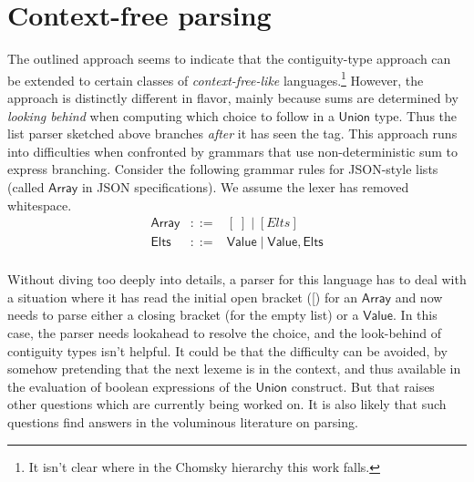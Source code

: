 \documentclass{article}
\newcommand{\konst}[1]{\ensuremath{\mathsf{#1}}}
\theoremstyle{definition}
\begin{document}

\section{Context-free parsing}

The outlined approach seems to indicate that the contiguity-type
approach can be extended to certain classes of
\emph{context-free-like} languages.\footnote{It isn't clear where in
  the Chomsky hierarchy this work falls.} However, the approach
is distinctly different in flavor, mainly because sums are determined
by \emph{looking behind} when computing which choice to follow in a
\konst{Union} type. Thus the list parser sketched above branches
\emph{after} it has seen the tag. This approach runs into difficulties when
confronted by grammars that use non-deterministic sum to express
branching. Consider the following grammar rules for JSON-style lists
(called \konst{Array} in JSON specifications). We assume the lexer has
removed whitespace.
\[
\begin{array}{rcl}
 \konst{Array} & ::= & [\; ] \mid [ \mathit{Elts} ] \\
 \konst{Elts}  & ::= & \konst{Value} \mid \konst{Value} ,  \konst{Elts} \\
\end{array}
\]

Without diving too deeply into details, a parser for this language has
to deal with a situation where it has read the initial open bracket
([) for an \konst{Array} and now needs to parse either a closing bracket
  (for the empty list) or a \konst{Value}. In this case, the parser
  needs lookahead to resolve the choice, and the look-behind of
  contiguity types isn't helpful. It could be that the difficulty can
  be avoided, by somehow pretending that the next lexeme is in the
  context, and thus available in the evaluation of boolean expressions
  of the \konst{Union} construct. But that raises other questions
  which are currently being worked on. It is also likely that such
  questions find answers in the voluminous literature on parsing.
\end{document}

